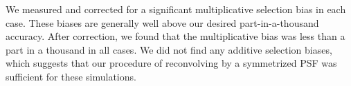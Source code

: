 \documentclass[iop, twocolappendix, appendixfloats, numberedappendix, apj]{emulateapj}
\newcommand{\snr}{$S/N$}
\newcommand{\Mcal}{\textsc{Metacalibration}}
\newcommand{\bdksim}{\texttt{BDK}}
\begin{document}
We measured and corrected for a significant multiplicative selection bias in
each case.  These biases are generally well above our desired
part-in-a-thousand accuracy.  After correction, we found that the
multiplicative bias was less than a part in a thousand in all cases.  We did
not find any additive selection biases, which suggests that our procedure of
reconvolving by a symmetrized PSF was sufficient for these simulations.

\end{document}
